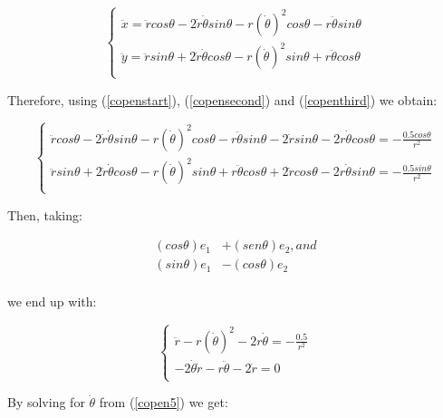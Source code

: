 \documentclass{article}
\begin{document}
\begin{equation}\label{copenthird}
\begin{cases}
\ddot{x} = \ddot{r} cos\theta - 2\dot{r}\dot{\theta} sin\theta - r(\dot{\theta})^2 cos \theta - r\ddot{\theta} sin \theta\\
\ddot{y} = \ddot{r} sin\theta + 2\dot{r}\dot{\theta} cos\theta - r(\dot{\theta})^2 sin \theta + r\ddot{\theta} cos \theta\\
\end{cases}   
\end{equation}

Therefore, using (\ref{copenstart}), (\ref{copensecond}) and (\ref{copenthird}) we obtain:

\begin{equation}\label{copen3}
\begin{cases}
\ddot{r} cos\theta - 2\dot{r}\dot{\theta} sin\theta - r(\dot{\theta})^2 cos \theta - r\ddot{\theta} sin \theta - 2\dot{r}sin\theta - 2r\dot{\theta} cos \theta = - \frac{0.5cos\theta}{r^2}\\
\ddot{r} sin\theta + 2\dot{r}\dot{\theta} cos\theta - r(\dot{\theta})^2 sin \theta + r\ddot{\theta} cos \theta + 2\dot{r}cos\theta - 2r\dot{\theta} sin\theta = - \frac{0.5sin\theta}{r^2}\\
\end{cases}   
\end{equation}

Then, taking:

\begin{equation}\label{copenfourth}
        \begin{split}
            (cos\theta)e_1 & + (sen\theta)e_2, and  \\
            (sin\theta)e_1 & - (cos\theta)e_2 \\
        \end{split}
\end{equation}

we end up with:

\begin{equation}\label{copen5}
\begin{cases}
\ddot{r}-r(\dot{\theta})^2 -2r\dot{\theta} =-\frac{0.5}{r^2}\\
-2\dot{\theta}\dot{r}-r\ddot{\theta} -2\dot{r} =0\\
\end{cases}   
\end{equation}

By solving for $\dot{\theta}$ from (\ref{copen5}) we get:
\end{document}
